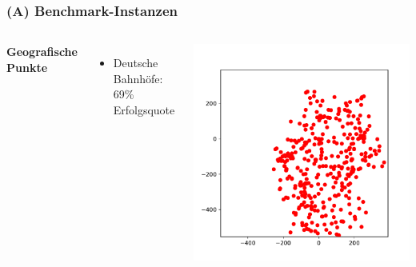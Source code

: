 \documentclass[aspectratio=169]{beamer}
\begin{document}
\begin{frame}
	\frametitle{(A) Benchmark-Instanzen}
	\begin{columns}[c] %
	
	\textbf{Geografische Punkte}
	\begin{itemize}
		\item Deutsche Bahnhöfe: 69\% Erfolgsquote
	\end{itemize}
	
	\includegraphics[scale=.5]{railway.pdf}
	

	\end{columns}
	\end{frame}

\end{document}
